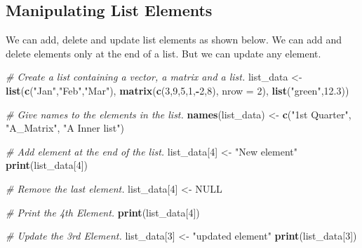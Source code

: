 \documentclass[]{book}
\newenvironment{Shaded}{\begin{snugshade}}{\end{snugshade}}
\newcommand{\KeywordTok}[1]{\textcolor[rgb]{0.13,0.29,0.53}{\textbf{#1}}}
\newcommand{\DataTypeTok}[1]{\textcolor[rgb]{0.13,0.29,0.53}{#1}}
\newcommand{\DecValTok}[1]{\textcolor[rgb]{0.00,0.00,0.81}{#1}}
\newcommand{\FloatTok}[1]{\textcolor[rgb]{0.00,0.00,0.81}{#1}}
\newcommand{\StringTok}[1]{\textcolor[rgb]{0.31,0.60,0.02}{#1}}
\newcommand{\CommentTok}[1]{\textcolor[rgb]{0.56,0.35,0.01}{\textit{#1}}}
\newcommand{\OtherTok}[1]{\textcolor[rgb]{0.56,0.35,0.01}{#1}}
\newcommand{\OperatorTok}[1]{\textcolor[rgb]{0.81,0.36,0.00}{\textbf{#1}}}
\newcommand{\NormalTok}[1]{#1}
\theoremstyle{definition}
\theoremstyle{definition}
\theoremstyle{definition}
\theoremstyle{remark}
\begin{document}
\subsection{Manipulating List
Elements}\label{manipulating-list-elements}

We can add, delete and update list elements as shown below. We can add
and delete elements only at the end of a list. But we can update any
element.

\begin{Shaded}
\begin{Highlighting}[]
\CommentTok{# Create a list containing a vector, a matrix and a list.}
\NormalTok{list_data <-}\StringTok{ }\KeywordTok{list}\NormalTok{(}\KeywordTok{c}\NormalTok{(}\StringTok{"Jan"}\NormalTok{,}\StringTok{"Feb"}\NormalTok{,}\StringTok{"Mar"}\NormalTok{), }\KeywordTok{matrix}\NormalTok{(}\KeywordTok{c}\NormalTok{(}\DecValTok{3}\NormalTok{,}\DecValTok{9}\NormalTok{,}\DecValTok{5}\NormalTok{,}\DecValTok{1}\NormalTok{,}\OperatorTok{-}\DecValTok{2}\NormalTok{,}\DecValTok{8}\NormalTok{), }\DataTypeTok{nrow =} \DecValTok{2}\NormalTok{),}
   \KeywordTok{list}\NormalTok{(}\StringTok{"green"}\NormalTok{,}\FloatTok{12.3}\NormalTok{))}

\CommentTok{# Give names to the elements in the list.}
\KeywordTok{names}\NormalTok{(list_data) <-}\StringTok{ }\KeywordTok{c}\NormalTok{(}\StringTok{"1st Quarter"}\NormalTok{, }\StringTok{"A_Matrix"}\NormalTok{, }\StringTok{"A Inner list"}\NormalTok{)}

\CommentTok{# Add element at the end of the list.}
\NormalTok{list_data[}\DecValTok{4}\NormalTok{] <-}\StringTok{ "New element"}
\KeywordTok{print}\NormalTok{(list_data[}\DecValTok{4}\NormalTok{])}
\end{Highlighting}
\end{Shaded}

\begin{Shaded}
\begin{Highlighting}[]
\CommentTok{# Remove the last element.}
\NormalTok{list_data[}\DecValTok{4}\NormalTok{] <-}\StringTok{ }\OtherTok{NULL}

\CommentTok{# Print the 4th Element.}
\KeywordTok{print}\NormalTok{(list_data[}\DecValTok{4}\NormalTok{])}
\end{Highlighting}
\end{Shaded}

\begin{Shaded}
\begin{Highlighting}[]
\CommentTok{# Update the 3rd Element.}
\NormalTok{list_data[}\DecValTok{3}\NormalTok{] <-}\StringTok{ "updated element"}
\KeywordTok{print}\NormalTok{(list_data[}\DecValTok{3}\NormalTok{])}
\end{Highlighting}
\end{Shaded}
\end{document}

